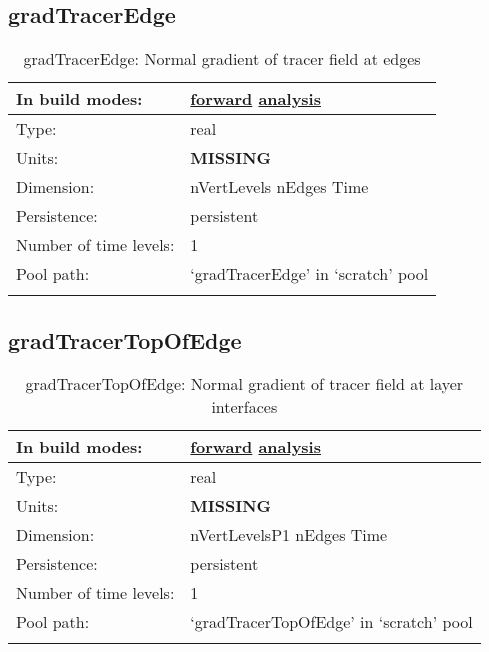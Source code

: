 \subsection[gradTracerEdge]{gradTracerEdge}
\label{subsec:var_sec_scratch_gradTracerEdge}
\begin{center}
\begin{longtable}{| p{2.0in} | p{4.0in} |}
        \hline 
        In build modes: & \hyperref[subsec:forward_var_tab_scratch]{forward} \hyperref[subsec:analysis_var_tab_scratch]{analysis} \\
        \hline 
        Type: & real \\
        \hline 
        Units: & {\bf \color{red} MISSING} \\
        \hline 
        Dimension: & nVertLevels nEdges Time \\
        \hline 
        Persistence: & persistent \\
        \hline 
        Number of time levels: & 1 \\
        \hline 
            Pool path: & `gradTracerEdge' in `scratch' pool \\
		 \hline 
    \caption{gradTracerEdge: Normal gradient of tracer field at edges}
\end{longtable}
\end{center}
\subsection[gradTracerTopOfEdge]{gradTracerTopOfEdge}
\label{subsec:var_sec_scratch_gradTracerTopOfEdge}
\begin{center}
\begin{longtable}{| p{2.0in} | p{4.0in} |}
        \hline 
        In build modes: & \hyperref[subsec:forward_var_tab_scratch]{forward} \hyperref[subsec:analysis_var_tab_scratch]{analysis} \\
        \hline 
        Type: & real \\
        \hline 
        Units: & {\bf \color{red} MISSING} \\
        \hline 
        Dimension: & nVertLevelsP1 nEdges Time \\
        \hline 
        Persistence: & persistent \\
        \hline 
        Number of time levels: & 1 \\
        \hline 
            Pool path: & `gradTracerTopOfEdge' in `scratch' pool \\
		 \hline 
    \caption{gradTracerTopOfEdge: Normal gradient of tracer field at layer interfaces}
\end{longtable}
\end{center}
